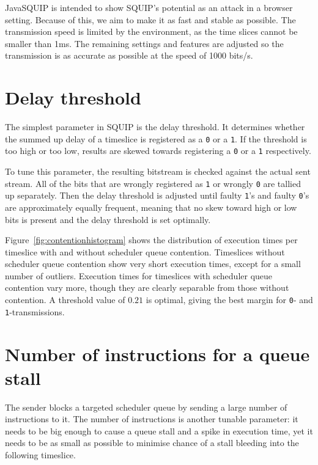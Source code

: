 \documentclass[11pt,
  titlepage=false,
  parskip=half,      %
]{scrreprt}
\begin{document}
JavaSQUIP is intended to show SQUIP's potential as an attack in a browser setting.
Because of this, we aim to make it as fast and stable as possible.
The transmission speed is limited by the environment, as the time slices cannot be smaller than 1ms.
The remaining settings and features are adjusted so the transmission is as accurate as possible at the speed of 1000 bits/s.

\section{Delay threshold}
\label{sec:delaythreshold}

The simplest parameter in SQUIP is the delay threshold.
It determines whether the summed up delay of a timeslice is registered as a \texttt{0} or a \texttt{1}.
If the threshold is too high or too low, results are skewed towards registering a \texttt{0} or a \texttt{1} respectively.

To tune this parameter, the resulting bitstream is checked against the actual sent stream.
All of the bits that are wrongly registered as \texttt{1} or wrongly \texttt{0} are tallied up separately.
Then the delay threshold is adjusted until faulty \texttt{1}'s and faulty \texttt{0}'s are approximately equally frequent,
meaning that no skew toward high or low bits is present and the delay threshold is set optimally.

Figure~\ref{fig:contentionhistogram} shows the distribution of execution times per timeslice with and without scheduler queue contention.
Timeslices without scheduler queue contention show very short execution times, except for a small number of outliers.
Execution times for timeslices with scheduler queue contention vary more, though they are clearly separable from those without contention.
A threshold value of $0.21$ is optimal, giving the best margin for \texttt{0}- and \texttt{1}-transmissions.


\section{Number of instructions for a queue stall}
The sender blocks a targeted scheduler queue by sending a large number of instructions to it.
The number of instructions is another tunable parameter:
it needs to be big enough to cause a queue stall and a spike in execution time,
yet it needs to be as small as possible to minimise chance of a stall bleeding into the following timeslice.
\end{document}
